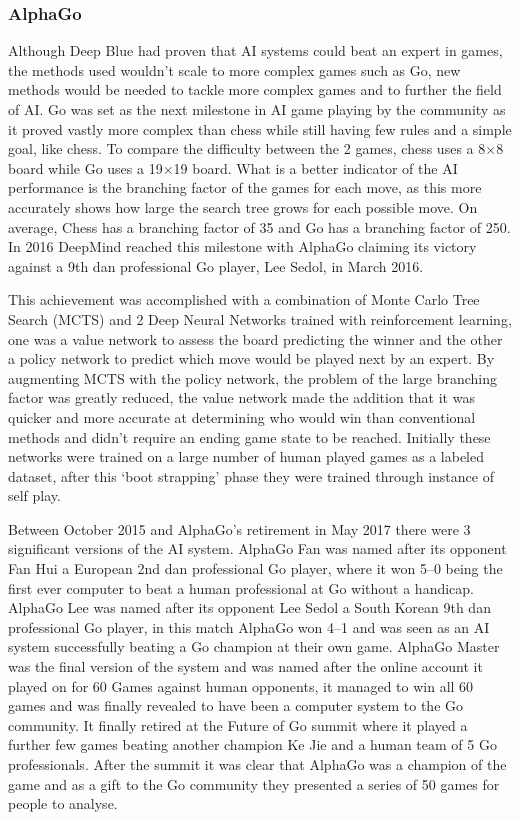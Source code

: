 \documentclass[a4paper]{article}
\begin{document}
\subsubsection{AlphaGo}
Although Deep Blue had proven that AI systems could beat an expert in games, the methods used wouldn't scale to more complex games such as Go, new methods would be needed to tackle more complex games and to further the field of AI\@.
Go was set as the next milestone in AI game playing by the community as it proved vastly more complex than chess while still having few rules and a simple goal, like chess.
To compare the difficulty between the 2 games, chess uses a 8\(\times \)8 board while Go uses a 19\(\times \)19 board.
What is a better indicator of the AI performance is the branching factor of the games for each move, as this more accurately shows how large the search tree grows for each possible move.
On average, Chess has a branching factor of 35 and Go has a branching factor of 250\cite{BranchingFactor}.
In 2016 DeepMind reached this milestone with AlphaGo claiming its victory against a 9th dan professional Go player, Lee Sedol, in March 2016\cite{alphaGo}.
\par
This achievement was accomplished with a combination of Monte Carlo Tree Search (MCTS) and 2 Deep Neural Networks trained with reinforcement learning, one was a value network to assess the board predicting the winner and the other a policy network to predict which move would be played next by an expert.
By augmenting MCTS with the policy network, the problem of the large branching factor was greatly reduced, the value network made the addition that it was quicker and more accurate at determining who would win than conventional methods and didn't require an ending game state to be reached.
Initially these networks were trained on a large number of human played games as a labeled dataset, after this `boot strapping' phase they were trained through instance of self play.
\par
Between October 2015 and AlphaGo's retirement in May 2017 there were 3 significant versions of the AI system.
AlphaGo Fan was named after its opponent Fan Hui a European 2nd dan professional Go player, where it won 5--0 being the first ever computer to beat a human professional at Go without a handicap.
AlphaGo Lee was named after its opponent Lee Sedol a South Korean 9th dan professional Go player, in this match AlphaGo won 4--1 and was seen as an AI system successfully beating a Go champion at their own game.
AlphaGo Master was the final version of the system and was named after the online account it played on for 60 Games against human opponents, it managed to win all 60 games and was finally revealed to have been a computer system to the Go community.
It finally retired at the Future of Go summit where it played a further few games beating another champion Ke Jie and a human team of 5 Go professionals.
After the summit it was clear that AlphaGo was a champion of the game and as a gift to the Go community they presented a series of 50 games for people to analyse.
\end{document}
